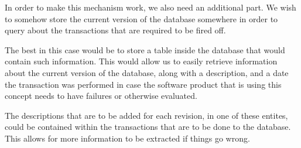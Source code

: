 In order to make this mechanism work, we also need an additional part. We wish
to somehow store the current version of the database somewhere in order to 
query about the transactions that are required to be fired off. 

The best in this case would be to store a table inside the database that would
contain such information. This would allow us to easily retrieve information
about the current version of the database, along with a description, and a date
the transaction was performed in case the software product that is using this
concept needs to have failures or otherwise evaluated.

The descriptions that are to be added for each revision, in one of these 
entites, could be contained within the transactions that are to be done to the
database. This allows for more information to be extracted if things go wrong.

